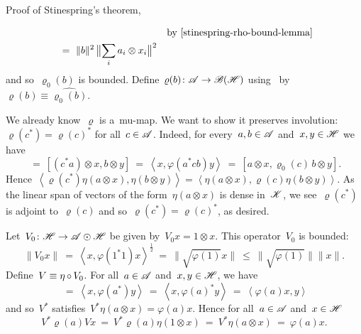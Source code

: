 \begin{parsec}
\begin{point}
\begin{point}{%
    Proof of Stinespring's theorem, }
\begin{point}
\begin{alignat*}{2}
    &\qquad& \text{by \eqref{stinespring-rho-bound-lemma}}\\
    &\ =\  \|b\|^2\, \bigl\| \sum_i a_i \otimes x_i \bigr\|^2
\end{alignat*}
and so~$\varrho_0(b)$ is bounded.
Define~$\varrho(b) \colon \mathscr{A} \to \mathscr{B}(\mathscr{H})$
    using~
    by~$\varrho(b) \equiv \widehat{\varrho_0(b)}$.
\end{point}
\begin{point}%
We already know~$\varrho$ is a~mu-map.
We want to show it preserves involution: $\varrho(c^*) = \varrho(c)^*$
for all~$c \in \mathscr{A}$.
Indeed, for every~$a,b \in \mathscr{A}$ and~$x,y \in \mathscr{H}$
    we have
    \begin{equation*}
        [\varrho_0(c^*) \, a\otimes x,b \otimes y]
        \ =\  [(c^* a)\otimes x,b \otimes y]
        \ =\  \left<x, \varphi(a^*cb) y \right>
        \ =\  [a\otimes x,\varrho_0(c)\, b \otimes y].
    \end{equation*}
Hence~$
    \left<\varrho(c^*) \eta(a\otimes x), \eta(b\otimes y)\right>=
    \left< \eta(a\otimes x), \varrho(c)\eta(b\otimes y)\right>$.
    As the linear span of vectors of the form~$\eta(a \otimes x)$
        is dense in~$\mathscr{K}$,
        we see~$\varrho(c^*)$ is adjoint to~$\varrho(c)$
        and so~$\varrho(c^*) = \varrho(c)^*$, as desired.
\end{point}
\begin{point}%
    Let~$V_0 \colon \mathscr{H} \to \mathscr{A} \odot \mathscr{H}$
        be given by~$V_0 x = 1 \otimes x$.
        This operator~$V_0$ is bounded:
\begin{equation*}
        \| V_0 x\|\  =\  \left<x, \varphi(1^*1) x\right>^{\frac{1}{2}}
        \ =\  \|\sqrt{\varphi(1)} x\| \ \leq \ \|\sqrt{\varphi(1)}\| \|x\|.
\end{equation*}
    Define~$V \equiv \eta \mathop{\circ} V_0$.
    For all~$a \in \mathscr{A}$ and~$x,y \in \mathscr{H}$, we have
\begin{equation*}
            [a \otimes x, V_0 y]
          \  =\ \left<x, \varphi(a^*)y\right>
          \  =\ \left<x, \varphi(a)^*y\right>
          \  =\ \left<\varphi(a) x, y\right>
\end{equation*}
    and so~$V^*$ satisfies~$V^* \eta(a \otimes x) = \varphi(a)x$.
    Hence for all~$a \in \mathscr{A}$ and~$x \in \mathscr{H}$
\begin{equation*}
    V^* \varrho(a) V x
        \ =\  V^* \varrho(a) \eta(1 \otimes x)
        \ =\  V^* \eta(a\otimes x)
        \ =\  \varphi(a)x.
\end{equation*}

\end{point}
\end{point}
\end{point}
\end{parsec}
